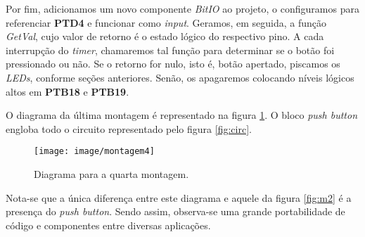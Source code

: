 Por fim, adicionamos um novo componente \textit{BitIO} ao projeto, o
configuramos para referenciar \textbf{PTD4} e funcionar como \textit{input}.
Geramos, em seguida, a função \textit{GetVal}, cujo valor de retorno é o estado
lógico do respectivo pino. A cada interrupção do \textit{timer}, chamaremos tal
função para determinar se o botão foi pressionado ou não. Se o retorno for nulo,
isto é, botão apertado, piscamos os \textit{LEDs}, conforme seções anteriores.
Senão, os apagaremos colocando níveis lógicos altos em \textbf{PTB18} e
\textbf{PTB19}.

\vspace{12pt}

O diagrama da última montagem é representado na figura \ref{fig:m4}. O bloco
\textit{push button} engloba todo o circuito representado pelo figura
\ref{fig:circ}.

\FloatBarrier

\begin{figure}[h]
    \centering
    \texttt{[image: image/montagem4]}
    
    \caption{Diagrama para a quarta montagem.}
    \label{fig:m4}
\end{figure} 

\FloatBarrier

Nota-se que a única diferença entre este diagrama e aquele da figura
\ref{fig:m2} é a presença do \textit{push button}. Sendo assim, observa-se uma
grande portabilidade de código e componentes entre diversas aplicações. 
